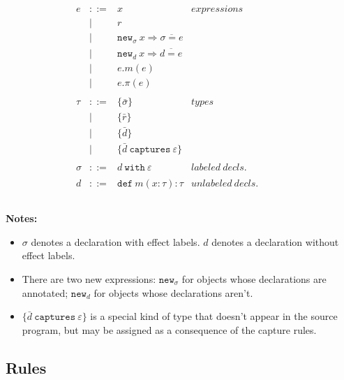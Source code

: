 \documentclass{llncs}
\newcommand{\keywadj}[1]{\mathtt{#1}}
\newcommand{\keyw}[1]{\keywadj{#1}~}
\begin{document}
\[
\begin{array}{lll}

\begin{array}{lllr}

e & ::= & x & expressions \\
  		& | & r \\
		& | & \keywadj{new}_\sigma~x \Rightarrow \overline{\sigma = e} \\
 		& | & \keywadj{new}_d~x \Rightarrow \overline{d = e} \\
 		& | & e.m(e)\\
 		& | & e.\pi(e)\\
		&&\\

\tau & ::= & \{ \bar \sigma \} & types \\
		& | & \{ \bar r \} \\
		& | & \{ \bar d \} \\
		& | & \{ \bar d ~\keyw{captures} \varepsilon \} \\
		&&\\
		
\sigma & ::= & d~\keyw{with}\varepsilon  & labeled~ decls.\\
		&&\\

d & ::= & \keyw{def} m(x:\tau):\tau & unlabeled~decls.\\
		&&\\

\end{array}
& ~~~~~~
&
\end{array}
\]

\noindent \textbf{Notes:}
\begin{itemize}
	\item $\sigma$ denotes a declaration with effect labels. $d$ denotes a declaration without effect labels.
	\item There are two new expressions: $\keywadj{new}_\sigma$ for objects whose declarations are annotated; $\keywadj{new}_d$ for objects whose declarations aren't.
	\item $\{ \bar d ~\keyw{captures} \varepsilon \}$ is a special kind of type that doesn't appear in the source program, but may be assigned as a consequence of the capture rules.
\end{itemize}

\subsection{Rules}
\end{document}
